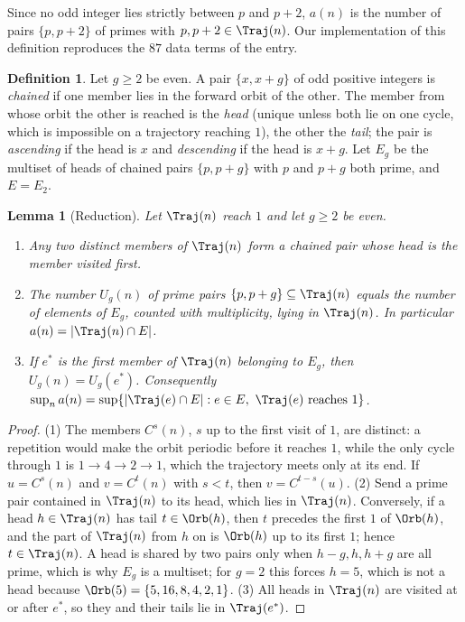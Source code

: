 \documentclass[11pt,a4paper]{article}
\newtheorem{lemma}[theorem]{Lemma}
\theoremstyle{definition}
\newtheorem{definition}[theorem]{Definition}
\theoremstyle{remark}
\numberwithin{equation}{section}
\begin{document}
Since no odd integer lies strictly between $p$ and $p+2$, $a(n)$ is the number
of pairs $\{p,p+2\}$ of primes with $p,p+2\in\Traj(n)$. Our implementation of
this definition reproduces the $87$ data terms of the entry.

\begin{definition}\label{B:P:def:chained}
Let $g\ge2$ be even. A pair $\{x,x+g\}$ of odd positive integers is
\emph{chained} if one member lies in the forward orbit of the other. The member
from whose orbit the other is reached is the \emph{head} (unique unless both lie on one cycle, which is impossible on a trajectory reaching $1$), the other the
\emph{tail}; the pair is \emph{ascending} if the head is $x$ and
\emph{descending} if the head is $x+g$. Let $E_g$ be the multiset of heads of
chained pairs $\{p,p+g\}$ with $p$ and $p+g$ both prime, and $E=E_2$.
\end{definition}

\begin{lemma}[Reduction]\label{B:P:lem:reduction}
Let $\Traj(n)$ reach $1$ and let $g\ge2$ be even.
\begin{enumerate}
\item Any two distinct members of $\Traj(n)$ form a chained pair whose head is
the member visited first.
\item The number $U_g(n)$ of prime pairs $\{p,p+g\}\subseteq\Traj(n)$ equals the
number of elements of $E_g$, counted with multiplicity, lying in $\Traj(n)$. In
particular $a(n)=|\Traj(n)\cap E|$.
\item If $e^*$ is the first member of $\Traj(n)$ belonging to $E_g$, then
$U_g(n)=U_g(e^*)$. Consequently $\sup_n a(n)=\sup\{|\Traj(e)\cap E|:e\in E,\ \Traj(e)\text{ reaches }1\}$.
\end{enumerate}
\end{lemma}

\begin{proof}
(1) The members $C^s(n)$, $s$ up to the first visit of $1$, are distinct: a
repetition would make the orbit periodic before it reaches $1$, while the only
cycle through $1$ is $1\to4\to2\to1$, which the trajectory meets only at its
end. If $u=C^s(n)$ and $v=C^t(n)$ with $s<t$, then $v=C^{t-s}(u)$.
(2) Send a prime pair contained in $\Traj(n)$ to its head, which lies in
$\Traj(n)$. Conversely, if a head $h\in\Traj(n)$ has tail $t\in\Orb(h)$, then
$t$ precedes the first $1$ of $\Orb(h)$, and the part of $\Traj(n)$ from $h$ on
is $\Orb(h)$ up to its first $1$; hence $t\in\Traj(n)$. A head is shared by two
pairs only when $h-g,h,h+g$ are all prime, which is why $E_g$ is a multiset; for
$g=2$ this forces $h=5$, which is not a head because
$\Orb(5)=\{5,16,8,4,2,1\}$.
(3) All heads in $\Traj(n)$ are visited at or after $e^*$, so they and their
tails lie in $\Traj(e^*)$.
\end{proof}
\end{document}
